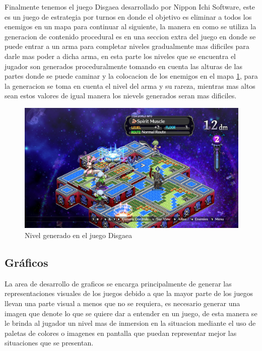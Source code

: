 Finalmente tenemos el juego Disgaea desarrollado por Nippon Ichi Software, este
es un juego de estrategia por turnos en donde el objetivo es eliminar a todos
los enemigos en un mapa para continuar al siguiente, la manera en como se
utiliza la generacion de contenido procedural es en una seccion extra del juego
en donde se puede entrar a un arma para completar niveles gradualmente mas
dificiles para darle mas poder a dicha arma, en esta parte los niveles que se
encuentra el jugador son generados proceduralmente tomando en cuenta las alturas
de las partes donde se puede caminar y la colocacion de los enemigos en el mapa
\ref{figure:DisgaeaIW}, para la generacion se toma en cuenta el nivel del arma y
su rareza, mientras mas altos sean estos valores de igual manera los nievels
generados seran mas dificiles.

\begin{figure}
    \centering
    \includegraphics[width=1.0\textwidth]{img/DisgaeaIW.png}
    \caption{Nivel generado en el juego Disgaea}
    \label{figure:DisgaeaIW}
\end{figure}

\subsection{Gráficos}
\label{subsection:Visuals}

La area de desarrollo de graficos se encarga principalmente de generar las
representaciones visuales de los juegos debido a que la mayor parte de los
juegos llevan una parte visual a menos que no se requiera, es necesario generar
una imagen que denote lo que se quiere dar a entender en un juego, de esta
manera se le brinda al jugador un nivel mas de inmersion en la situacion
mediante el uso de paletas de colores o imagenes en pantalla que puedan
representar mejor las situaciones que se presentan.


